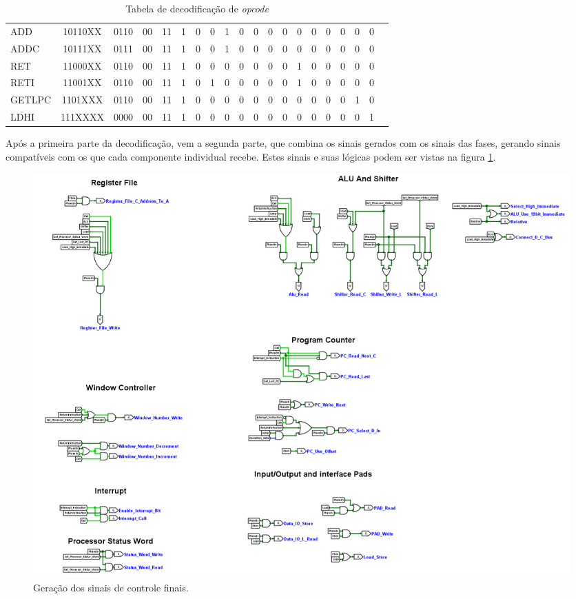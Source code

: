 \documentclass[
	article,			%
	11pt,				%
	oneside,			%
	a4paper,			%
	english,			%
	brazil,				%
	sumario=tradicional
	]{abntex2}
\begin{document}
\begin{table}[!htp]
\begin{tabular}{lccccccccccccccccccc}
ADD &10110XX &0110 &00 &11 &1 &0 &0 &1 &0 &0 &0 &0 &0 &0 &0 &0 &0 &0 \\
ADDC &10111XX &0111 &00 &11 &1 &0 &0 &1 &0 &0 &0 &0 &0 &0 &0 &0 &0 &0 \\
RET &11000XX &0110 &00 &11 &1 &0 &0 &0 &0 &0 &0 &0 &1 &0 &0 &0 &0 &0 \\
RETI &11001XX &0110 &00 &11 &1 &0 &1 &0 &0 &0 &0 &0 &1 &0 &0 &0 &0 &0 \\
GETLPC &1101XXX &0110 &00 &11 &1 &0 &0 &0 &0 &0 &0 &0 &0 &0 &0 &0 &1 &0 \\
LDHI &111XXXX &0000 &00 &11 &1 &0 &0 &0 &0 &0 &0 &0 &0 &0 &0 &0 &0 &1 \\
\bottomrule
\end{tabular}
\caption{Tabela de decodificação de \textit{opcode}}\label{tab:opcodeDecoder}
\end{table}

Após a primeira parte da decodificação, vem a segunda parte, que combina os sinais gerados com os sinais das fases, gerando sinais compatíveis com os que cada componente individual recebe. Estes sinais e suas lógicas podem ser vistas na figura \ref{fig:controller2}.

\begin{figure}[H]
    \centering
    \includegraphics[width=0.75\linewidth]{Logisim/controller2.png}
    \caption{Geração dos sinais de controle finais.}
    \label{fig:controller2}
\end{figure}
\end{document}
